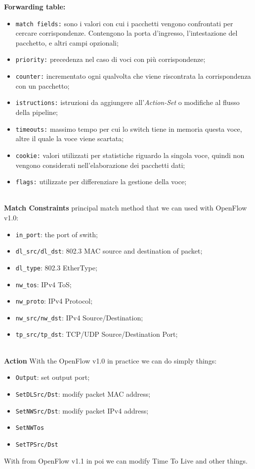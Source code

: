 \documentclass[conference,10pt]{IEEEtran}
\begin{document}
\textbf{Forwarding table:}
\begin{itemize}
 \item \texttt{match fields:} sono i valori con cui i pacchetti vengono confrontati per cercare corrispondenze. Contengono la porta d'ingresso, l'intestazione del pacchetto, 
 e altri campi opzionali;
 \item \texttt{priority:} precedenza nel caso di voci con pi\`u corrispondenze;
 \item \texttt{counter:} incrementato ogni qualvolta che viene riscontrata la corrispondenza con un pacchetto;
 \item \texttt{istructions:} istruzioni da aggiungere all'\emph{Action-Set} o modifiche al flusso della pipeline;
 \item \texttt{timeouts:} massimo tempo per cui lo switch tiene in memoria questa voce, altre il quale la voce viene scartata;
 \item \texttt{cookie:} valori utilizzati per statistiche riguardo la singola voce, quindi non vengono considerati nell'elaborazione dei pacchetti dati;
 \item \texttt{flags:} utilizzate per differenziare la gestione della voce;
 \\
 \\
\end{itemize}

\textbf{Match Constraints}
principal match method that we can used with OpenFlow v1.0:
\begin{itemize}
 \item \texttt{in_port}: the port of swith;
 \item \texttt{dl_src/dl_dst}: 802.3 MAC source and destination of packet;
 \item \texttt{dl_type}: 802.3 EtherType;
 \item \texttt{nw_tos}: IPv4 ToS;
 \item \texttt{nw_proto}: IPv4 Protocol;
 \item \texttt{nw_src/nw_dst}: IPv4 Source/Destination;
 \item \texttt{tp_src/tp_dst}: TCP/UDP Source/Destination Port;
 \\
 \\
\end{itemize}

\textbf{Action}
With the OpenFlow v1.0 in practice we can do simply things:
\begin{itemize}
 \item \texttt{Output}: set output port;
 \item \texttt{SetDLSrc/Dst}: modify packet MAC address;
 \item \texttt{SetNWSrc/Dst}: modify packet IPv4 address;
 \item \texttt{SetNWTos}
 \item \texttt{SetTPSrc/Dst}
\end{itemize}
With from OpenFlow v1.1 in poi we can modify Time To Live and other things.
\end{document}

